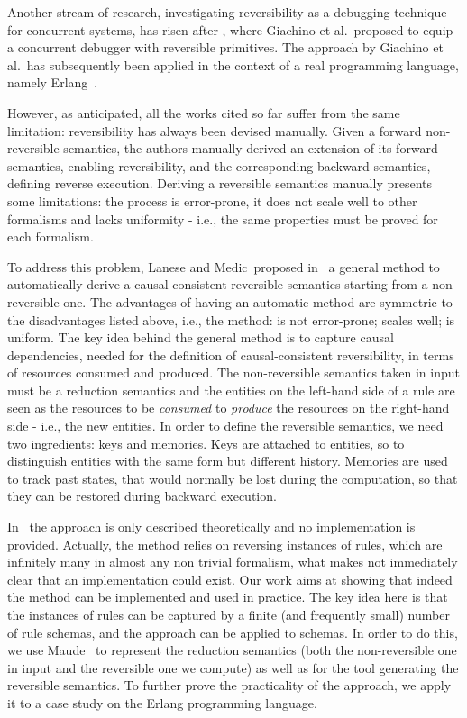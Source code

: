 \documentclass{article}[12pt,a4paper]
\theoremstyle{definition}
\begin{document}
Another stream of research, investigating reversibility as a debugging technique for concurrent systems,
has risen after \cite{GiachinoLM14}, where Giachino et al.~proposed to
equip a concurrent debugger with reversible primitives.
The approach by Giachino et al.~has subsequently been applied in the context of a real programming language, namely Erlang~\cite{LaneseNPV18,Lanese0PV18,Gonzalez-AbrilV21,FabbrettiLS21}.

However, as anticipated, all the works cited so far suffer from the same limitation: reversibility has always been
devised manually. Given a forward non-reversible semantics, the authors manually
derived an extension of its forward semantics, enabling reversibility, and the corresponding backward semantics, defining reverse execution.
Deriving a reversible semantics manually presents some limitations: the
process is error-prone, it does not scale well to other formalisms and lacks
uniformity - i.e., the same properties must be proved for each formalism.

To address this problem, Lanese and Medic~proposed in~\cite{LaneseM20} a
general method to
automatically derive a causal-consistent reversible semantics starting from a non-reversible one. The
advantages of having an automatic method are symmetric to the disadvantages
listed above, i.e., the method: is not error-prone; scales well; is uniform. The key idea behind the general method is to capture
causal dependencies, needed for the definition of causal-consistent reversibility, in terms of resources consumed and produced. The non-reversible
semantics taken in input must be a reduction semantics and the entities on the
left-hand side of a rule are seen as the resources to be \emph{consumed} to
\emph{produce} the resources on the right-hand side - i.e., the new entities.
In order to define the reversible semantics, we need two ingredients: keys and memories.
Keys are attached to entities, so to distinguish entities with the same form but different history.
Memories are used to track past states, that would normally be lost during the computation, so that
they can be restored during backward execution.

In~\cite{LaneseM20} the approach is only described theoretically and
no implementation is provided. Actually, the method relies on
reversing instances of rules, which are infinitely many in almost any
non trivial formalism, what makes not immediately clear that an
implementation could exist. Our work aims at showing that indeed the
method can be implemented and used in practice.  The key idea here is
that the instances of rules can be captured by a finite (and
frequently small) number of rule schemas, and the approach can be
applied to schemas. In order to do this, we use Maude~\cite{maude} to represent the reduction semantics (both the non-reversible one in input and the reversible one we compute) as well as for the tool generating the reversible semantics.
To further prove the practicality of the
approach, we apply it to a case study on the Erlang programming
language.
\end{document}
